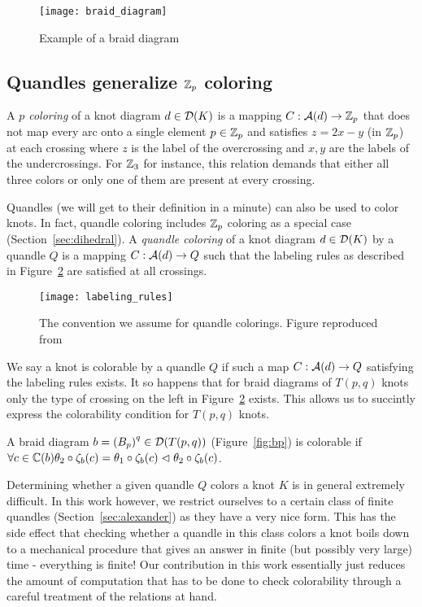 \documentclass[paper.tex]{subfiles}
\begin{document}
\begin{figure}[h]
  \centering
  \texttt{[image: braid\_diagram]}
  \caption{Example of a braid diagram}\label{fig:braid_diagram}
\end{figure}

\subsection{Quandles generalize $\mathbb{Z}_p$ coloring}

A \emph{$p$ coloring} of a knot diagram $d \in \operatorname{\mathcal{D}}(K)$ is a mapping $C: \mathcal{A}(d) \to \mathbb{Z}_p$ that does not map every arc onto a single element $p \in \mathbb{Z}_p$ and satisfies $z = 2x - y$ (in $\mathbb{Z}_p$) at each crossing where
$z$ is the label of the overcrossing and $x,y$ are the labels of the undercrossings. For $\mathbb{Z}_3$ for instance, this relation demands that either all three colors or only one of them are present at every crossing.

Quandles (we will get to their definition in a minute) can also be used to color knots. In fact, quandle coloring includes $\mathbb{Z}_p$ coloring as a special case (Section~\ref{sec:dihedral}). A \emph{quandle coloring} of a knot diagram
$d \in \operatorname{\mathcal{D}}(K)$ by a quandle $Q$ is a mapping $C: \mathcal{A}(d) \to Q$ such that the labeling rules as described in Figure~\ref{fig:labeling_rules} are satisfied at all crossings.

\begin{figure}[H]
  \centering
  \texttt{[image: labeling\_rules]}
  \caption{The convention we assume for quandle colorings. Figure reproduced from~\cite{Cusick}}\label{fig:labeling_rules}
\end{figure}


We say a knot is colorable by a quandle $Q$ if such a map $C: \mathcal{A}(d) \to Q$ satisfying the labeling rules exists. It so happens that for braid diagrams of $T(p,q)$ knots only the type of crossing on the left in
Figure~\ref{fig:labeling_rules} exists. This allows us to succintly express the colorability condition for $T(p,q)$ knots.

A braid diagram $b = {(B_p)}^q \in \operatorname{\mathcal{D}}(T(p,q))$ (Figure~\ref{fig:bp}) is colorable if $\forall c \in  \mathbb{C}(b) \theta_2 \circ \zeta_b(c) = \theta_1 \circ \zeta_b(c) \vartriangleleft \theta_2 \circ \zeta_b(c)$.

Determining whether a given quandle $Q$ colors a knot $K$ is in general extremely difficult. In this work however, we restrict ourselves to a certain class of finite quandles (Section~\ref{sec:alexander}) as they have a very nice
form. This has the side effect that checking whether a quandle in this class colors a knot boils down to a mechanical procedure that gives an answer in finite (but possibly very large) time - everything is finite! Our contribution
in this work essentially just reduces the amount of computation that has to be done to check colorability through a careful treatment of the relations at hand.
\end{document}
